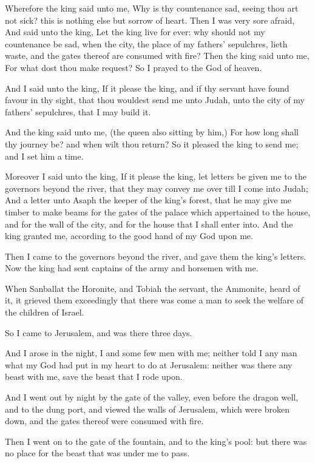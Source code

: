 \Verse Wherefore the king said unto me, Why is thy countenance sad, seeing thou art not sick? this is nothing else but sorrow of heart.  Then I was very sore afraid, \Verse And said unto the king, Let the king live for ever: why should not my countenance be sad, when the city, the place of my fathers' sepulchres, lieth waste, and the gates thereof are consumed with fire?  \Verse Then the king said unto me, For what dost thou make request? So I prayed to the God of heaven.

\Verse And I said unto the king, If it please the king, and if thy servant have found favour in thy sight, that thou wouldest send me unto Judah, unto the city of my fathers' sepulchres, that I may build it.

\Verse And the king said unto me, (the queen also sitting by him,) For how long shall thy journey be? and when wilt thou return? So it pleased the king to send me; and I set him a time.

\Verse Moreover I said unto the king, If it please the king, let letters be given me to the governors beyond the river, that they may convey me over till I come into Judah; \Verse And a letter unto Asaph the keeper of the king's forest, that he may give me timber to make beams for the gates of the palace which appertained to the house, and for the wall of the city, and for the house that I shall enter into. And the king granted me, according to the good hand of my God upon me.

\Verse Then I came to the governors beyond the river, and gave them the king's letters. Now the king had sent captains of the army and horsemen with me.

\Verse When Sanballat the Horonite, and Tobiah the servant, the Ammonite, heard of it, it grieved them exceedingly that there was come a man to seek the welfare of the children of Israel.

\Verse So I came to Jerusalem, and was there three days.

\Verse And I arose in the night, I and some few men with me; neither told I any man what my God had put in my heart to do at Jerusalem: neither was there any beast with me, save the beast that I rode upon.

\Verse And I went out by night by the gate of the valley, even before the dragon well, and to the dung port, and viewed the walls of Jerusalem, which were broken down, and the gates thereof were consumed with fire.

\Verse Then I went on to the gate of the fountain, and to the king's pool: but there was no place for the beast that was under me to pass.

